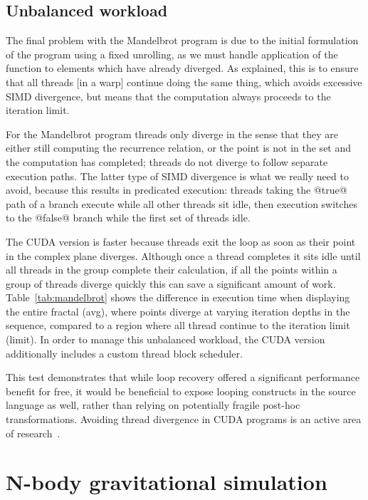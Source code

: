 \subsection{Unbalanced workload}

The final problem with the Mandelbrot program is due to the initial formulation
of the program using a fixed unrolling, as we must handle application of the
function to elements which have already diverged. As explained, this is to
ensure that all threads [in a warp] continue doing the same thing, which avoids
excessive SIMD divergence, but means that the computation always proceeds to the
iteration limit.

For the Mandelbrot program threads only diverge in the sense that they are
either still computing the recurrence relation, or the point is not in the set
and the computation has completed; threads do not diverge to follow separate
execution paths. The latter type of SIMD divergence is what we really need to
avoid, because this results in predicated execution: threads taking the
@true@ path of a branch execute while all other threads sit idle, then
execution switches to the @false@ branch while the first set of threads
idle.

The CUDA version is faster because threads exit the loop as soon as their point
in the complex plane diverges. Although once a thread completes it sits idle
until all threads in the group complete their calculation, if all the points
within a group of threads diverge quickly this can save a significant amount of
work. Table~\ref{tab:mandelbrot} shows the difference in execution time when
displaying the entire fractal (avg), where points diverge at varying iteration
depths in the sequence, compared to a region where all thread continue to the
iteration limit (limit). In order to manage this unbalanced workload, the CUDA
version additionally includes a custom thread block scheduler.

This test demonstrates that while loop recovery offered a significant
performance benefit for free, it would be beneficial to expose looping
constructs in the source language as well, rather than relying on potentially
fragile post-hoc transformations. Avoiding thread divergence in CUDA programs is
an active area of research~\cite{Zhang:2010jc}.

\section{N-body gravitational simulation}
\label{sec:nbody}

